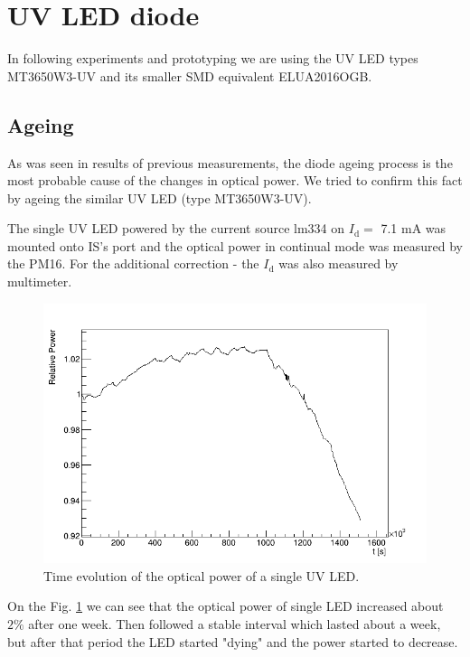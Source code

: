 \section{UV LED diode}

In following experiments and prototyping we are using the UV LED types MT3650W3-UV and its smaller SMD equivalent ELUA2016OGB.

\subsection{Ageing}
As was seen in results of previous measurements, the diode ageing process is the most probable cause of the changes in optical power. We tried to confirm this fact by ageing the similar UV LED (type MT3650W3-UV).
\par
The single UV LED powered by the current source lm334 on $I_\textrm{d} =$ 7.1 mA was mounted onto IS's port and the optical power in continual mode was measured by the PM16. For the additional correction - the $I_\textrm{d} $ was also measured by multimeter.


\par
\begin{figure}[H]
 \centering
 \includegraphics[scale=0.8]{./pictures/corrected1}
 \caption{Time evolution of the optical power of a single UV LED.}
 \label{SingleDiod}
\end{figure}
\par
On the Fig. \ref{SingleDiod} we can see that the optical power of single LED increased about $2 \%$ after one week. Then followed a stable interval which lasted about a week, but after that period the LED started "dying" and the power started to decrease.


